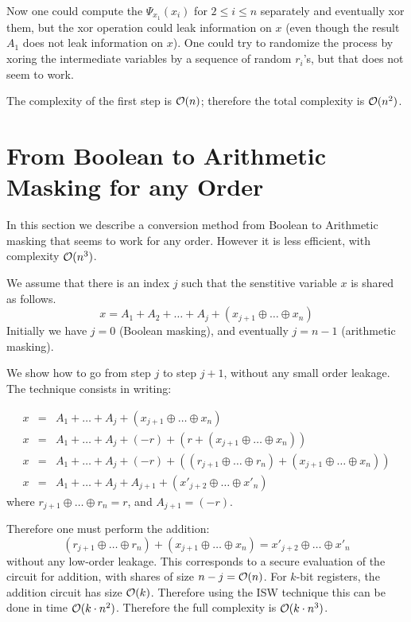 \documentclass[11pt]{llncs}
\begin{document}
Now one could compute the $\Psi_{x_1}(x_i)$ for $2 \leq i \leq n$
separately and eventually xor them, but the xor operation could leak
information on $x$ (even though the result $A_1$ does not leak information
on $x$). One could try to randomize the process by xoring the
intermediate variables by a sequence of random $r_i$'s, but that does
not seem to work. 

The complexity of the first step is ${\cal O}(n)$; therefore the total
complexity is ${\cal O}(n^2)$. 

\section{From Boolean to Arithmetic Masking for any Order}

\label{s:boolarithany}

In this section we describe a conversion method from Boolean to
Arithmetic masking that seems to work for any order. However it is
less efficient, with complexity ${\cal O}(n^3)$.

We assume that there is an index $j$ such that the senstitive variable
$x$ is shared as follows.
$$ x=A_1 + A_2 + \ldots+ A_j + (x_{j+1} \oplus \ldots \oplus x_n)$$
Initially we have $j=0$ (Boolean masking), and eventually $j=n-1$
(arithmetic masking).

We show how to go from step $j$ to step $j+1$, without any small order
leakage. The technique consists in writing:

\begin{eqnarray*}
x & = & A_1 + \ldots +A_j + (x_{j+1} \oplus \ldots \oplus x_n)\\
x & = & A_1 + \ldots +A_j + (-r)+ \left( r + (x_{j+1} \oplus \ldots
\oplus x_n) \right) \\
x & = & A_1 + \ldots + A_{j} + (-r)+  \left( (r_{j+1} \oplus \ldots \oplus
r_n) + (x_{j+1} \oplus \ldots
\oplus x_n)   \right) \\
x & = & A_1 + \ldots + A_{j} + A_{j+1}+  \left( x'_{j+2} \oplus \ldots \oplus
x'_n \right)
\end{eqnarray*}
where $r_{j+1} \oplus \ldots \oplus r_n=r$, and $A_{j+1}=(-r)$.

Therefore one must perform the addition:
$$(r_{j+1} \oplus \ldots \oplus
r_n) + (x_{j+1} \oplus \ldots
\oplus x_n)=  x'_{j+2} \oplus \ldots \oplus
x'_n $$
without any low-order leakage. This corresponds to a secure evaluation
of the
circuit for addition, with shares of size $n-j= {\cal O}(n)$. For
$k$-bit registers, the addition circuit has size ${\cal
  O}(k)$. Therefore using the ISW technique  \cite{isw} this can be done in time ${\cal O}(k \cdot
n^2)$. Therefore the full complexity is ${\cal O}(k \cdot n^3)$.
\end{document}
